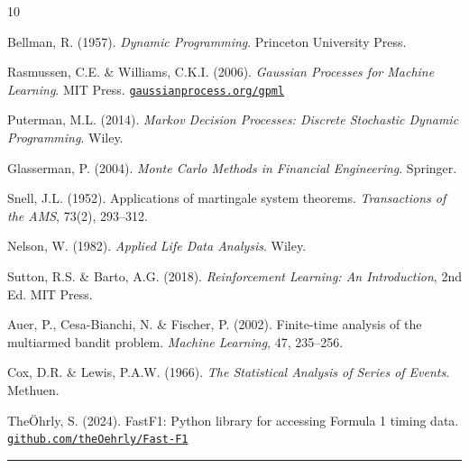 \documentclass[11pt, a4paper, twocolumn]{article}
\numberwithin{equation}{section}
\theoremstyle{definition}
\begin{document}
\begin{thebibliography}{10}
\small

  Bellman, R. (1957).
  \textit{Dynamic Programming}.
  Princeton University Press.

  Rasmussen, C.E. \& Williams, C.K.I. (2006).
  \textit{Gaussian Processes for Machine Learning}.
  MIT Press.
  \href{http://www.gaussianprocess.org/gpml}{\texttt{gaussianprocess.org/gpml}}

  Puterman, M.L. (2014).
  \textit{Markov Decision Processes: Discrete Stochastic Dynamic Programming}.
  Wiley.

  Glasserman, P. (2004).
  \textit{Monte Carlo Methods in Financial Engineering}.
  Springer.

  Snell, J.L. (1952).
  Applications of martingale system theorems.
  \textit{Transactions of the AMS}, 73(2), 293--312.

  Nelson, W. (1982).
  \textit{Applied Life Data Analysis}.
  Wiley.

  Sutton, R.S. \& Barto, A.G. (2018).
  \textit{Reinforcement Learning: An Introduction}, 2nd Ed.
  MIT Press.

  Auer, P., Cesa-Bianchi, N. \& Fischer, P. (2002).
  Finite-time analysis of the multiarmed bandit problem.
  \textit{Machine Learning}, 47, 235--256.

  Cox, D.R. \& Lewis, P.A.W. (1966).
  \textit{The Statistical Analysis of Series of Events}.
  Methuen.

  The\"{O}hrly, S. (2024).
  FastF1: Python library for accessing Formula 1 timing data.
  \href{https://github.com/theOehrly/Fast-F1}{\texttt{github.com/theOehrly/Fast-F1}}

\end{thebibliography}

\vspace{8pt}
\noindent\textcolor{pitgrey!60}{\rule{\columnwidth}{0.25pt}}
\vspace{2pt}

\end{document}
